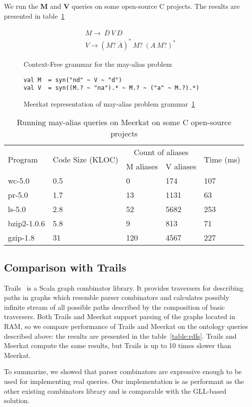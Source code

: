 We run the \textbf{M} and \textbf{V} queries on some open-source C projects.
The results are presented in table~\ref{table:staticAnalysis} 

\begin{figure}[t]
\begin{align*}
& M \rightarrow\ \overline{D}\ V\ D\\
& V \rightarrow (M ?\ \overline{A})^{*} \ M?\ (A\ M?)^{*}
\end{align*}
\caption{Context-Free grammar for the may-alias problem}
\label{lst:aliasGrammar}
\end{figure}

\begin{figure}[h]
\begin{lstlisting}
val M  = syn("nd" ~ V ~ "d")
val V  = syn((M.? ~ "na").* ~ M.? ~ ("a" ~ M.?).*)
\end{lstlisting}
\caption{Meerkat representation of may-alias problem grammar~\ref{lst:aliasGrammar}}
\label{fig:aliasMeerkat}
\end{figure}


\begin{table}[t]
\centering
\begin{tabular}{|l|l|ll|l|}
\hline
\multirow{2}{*}{Program} & \multirow{2}{*}{Code Size (KLOC)} & \multicolumn{2}{c|}{Count of aliases} & \multirow{2}{*}{Time (ms)} \\ \cline{3-4}
 &  & \multicolumn{1}{c|}{M aliases} & \multicolumn{1}{c|}{V aliases} &  \\ 
\hline
\hline
wc-5.0      & 0.5 & 0   & 174  & 107 \\
pr-5.0      & 1.7 & 13  & 1131 & 63  \\
ls-5.0      & 2.8 & 52  & 5682 & 253 \\
bzip2-1.0.6 & 5.8 & 9   & 813  & 71  \\
gzip-1.8    & 31  & 120 & 4567 & 227 \\
\hline
\end{tabular}
\caption{Running may-alias queries on Meerkat on some C open-source projects}
\label{table:staticAnalysis}
\end{table}

\subsection{Comparison with Trails}

Trails~\cite{ScalaGraphParsing} is a Scala graph combinator library.
It provides traversers for describing paths in graphs which resemble parser combinators and calculates possibly infinite stream of all possible paths described by the composition of basic traversers.
Both Trails and Meerkat support parsing of the graphs located in RAM, so we compare performance of Trails and Meerkat on the ontology queries described above: the results are presented in the table~\ref{table:rdfs}.
Trails and Meerkat compute the same results, but Trails is up to 10 times slower than Meerkat.

To summarize, we showed that parser combinators are expressive enough to be used for implementing real queries. 
Our implementation is as performant as the other existing combinators library and is comparable with the GLL-based solution.

